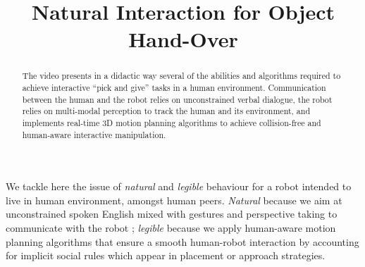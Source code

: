 \documentclass[conference]{IEEEtran}
\begin{document}
%
\title{Natural Interaction for Object Hand-Over}


\author{
}
\maketitle


\begin{abstract}

The video presents in a didactic way several of the abilities and algorithms
required to achieve interactive ``pick and give'' tasks in a human environment.
Communication between the human and the robot relies on unconstrained verbal
dialogue, the robot relies on multi-modal perception to track the human and its
environment, and implements real-time 3D motion planning algorithms to achieve
collision-free and human-aware interactive manipulation.

\end{abstract}


We tackle here the issue of \emph{natural} and \emph{legible} behaviour for a
robot intended to live in human environment, amongst human peers.
\emph{Natural} because we aim at unconstrained spoken English mixed with
gestures and perspective taking to communicate with the robot ; \emph{legible}
because we apply human-aware motion planning algorithms that ensure a smooth
human-robot interaction by accounting for implicit social rules which appear in
placement or approach strategies.

\vspace{1em}

\end{document}
